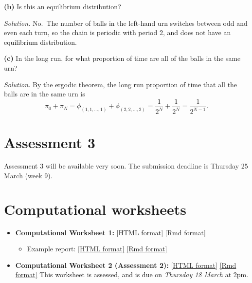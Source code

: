 \documentclass[
  a4paper,
]{article}
\providecommand{\tightlist}{%
  \setlength{\itemsep}{0pt}\setlength{\parskip}{0pt}}
\theoremstyle{definition}
\theoremstyle{definition}
\theoremstyle{definition}
\theoremstyle{remark}
\begin{document}
\textbf{(b)} Is this an equilibrium distribution?

\begin{myanswers}

\emph{Solution.} No.~The number of balls in the left-hand urn switches between odd and even each turn, so the chain is periodic with period 2, and does not have an equilibrium distribution.

\end{myanswers}

\textbf{(c)}
In the long run, for what proportion of time are all of the balls in the same urn?

\begin{myanswers}

\emph{Solution.} By the ergodic theorem, the long run proportion of time that all the balls are in the same urn is
\[ \pi_0 + \pi_N = \phi_{(1,1,\dots,1)} + \phi_{(2,2,\dots,2)} = \frac{1}{2^N} + \frac{1}{2^N} = \frac{1}{2^{N-1}} . \]

\end{myanswers}

\hypertarget{A3}{%
\section*{Assessment 3}\label{A3}}

Assessment 3 will be available very soon. The submission deadline is Thursday 25 March (week 9).

\hypertarget{computing}{%
\section*{Computational worksheets}\label{computing}}

\begin{itemize}
\tightlist
\item
  \textbf{Computational Worksheet 1:} \href{computing/C1.html}{{[}HTML format{]}} \href{computing/C1.Rmd}{{[}Rmd format{]}}

  \begin{itemize}
  \tightlist
  \item
    Example report: \href{computing/C1-example.html}{{[}HTML format{]}} \href{computing/C1-example.Rmd}{{[}Rmd format{]}}
  \end{itemize}
\item
  \textbf{Computational Worksheet 2 (Assessment 2):} \href{computing/C2.html}{{[}HTML format{]}} \href{computing/C2.Rmd}{{[}Rmd format{]}} This worksheet is assessed, and is due on \emph{Thursday 18 March} at 2pm.
\end{itemize}
\end{document}
